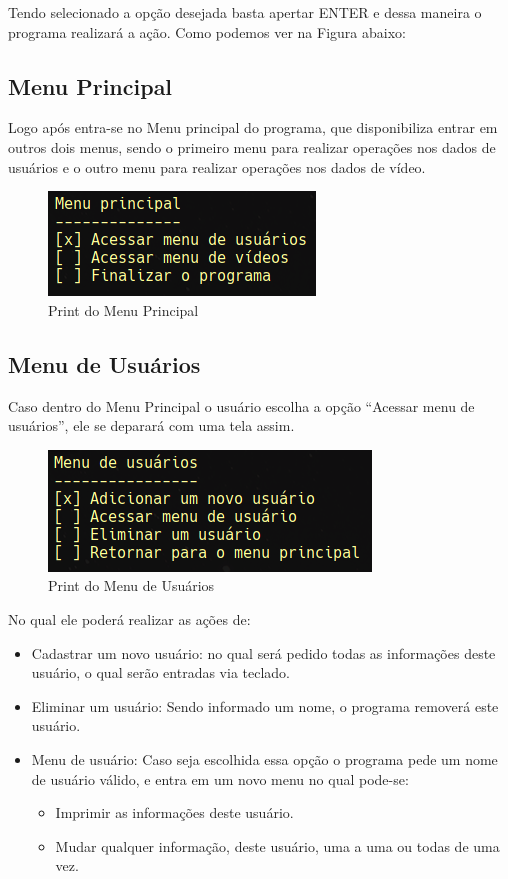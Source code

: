 \documentclass[12pt, a4paper]{article}
\begin{document}
Tendo selecionado a opção desejada basta apertar ENTER e dessa maneira o programa realizará a ação. Como podemos ver na Figura abaixo:


\subsection{Menu Principal}
Logo após entra-se no Menu principal do programa, que disponibiliza entrar em outros dois menus, sendo o primeiro menu para realizar operações nos dados de usuários e o outro menu para realizar operações nos dados de vídeo.
\begin{figure}[!htb]
	\centering
	\includegraphics[keepaspectratio]{MenuPrincipal.png}
	\caption{\label{fig:MenuPrincipal.png}Print do Menu Principal}
\end{figure}
\subsection{Menu de Usuários}
Caso dentro do Menu Principal o usuário escolha a opção ``Acessar menu de usuários'', ele se deparará com uma tela assim.

\begin{figure}[!htb]
	\centering
	\includegraphics[keepaspectratio]{MenuPUsuarios.png}
	\caption{\label{fig:MenuPUsuarios.png}Print do Menu de Usuários}
\end{figure}
No qual ele poderá realizar as ações de:
\begin{itemize}
	\item Cadastrar um novo usuário: no qual será pedido todas as informações deste usuário, o qual serão entradas via teclado.
	\item Eliminar um usuário: Sendo informado um nome, o programa removerá este usuário.
	\item Menu de usuário: Caso seja escolhida essa opção o programa pede um nome de usuário válido, e entra em um novo menu no qual pode-se:
		\begin{itemize}
			\item Imprimir as informações deste usuário.
			\item Mudar qualquer informação, deste usuário, uma a uma ou todas de uma vez.
		\end{itemize}

\end{itemize}
\end{document}
